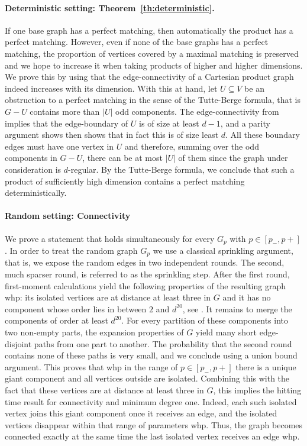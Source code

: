 \documentclass[notitlepage]{scrartcl}
\begin{document}
\paragraph{Deterministic setting: Theorem~\ref{th:deterministic}.}
If one base graph has a perfect matching, then automatically the product has a perfect matching. However, even if none of the base graphs has a perfect matching, the proportion of vertices covered by a maximal matching is preserved and we hope to increase it when taking products of higher and higher dimensions. We prove this by using that the edge-connectivity of a Cartesian product graph indeed increases with its dimension. With this at hand, let $U \subseteq V$ be an obstruction to a perfect matching in the sense of the Tutte-Berge formula, that is $G - U$ contains more than $|U|$ odd components. The edge-connectivity from  implies that the edge-boundary of $U$ is of size at least $d-1$, and a parity argument shows then shows that in fact this is of size least $d$. All these boundary edges must have one vertex in $U$ and therefore, summing over the odd components in $G-U$, there can be at most $|U|$ of them since the graph under consideration is $d$-regular. By the Tutte-Berge formula, we conclude that such a product of sufficiently high dimension contains a perfect matching deterministically.


\paragraph{Random setting: Connectivity}

We prove a statement that holds simultaneously for every $G_p$ with $p \in [p_-,p+]$. In order to treat the random graph $G_p$ we use a classical sprinkling argument, that is, we expose the random edges in two independent rounds. The second, much sparser round, is referred to as the sprinkling step. After the first round, first-moment calculations yield the following properties of the resulting graph whp: its isolated vertices are at distance at least three in $G$ and it has no component whose order lies in between $2$ and $d^{20}$, see . It remains to merge the components of order at least $d^{20}$. For every partition of these components into two non-empty parts, the expansion properties of $G$ yield many short edge-disjoint paths from one part to another. The probability that the second round contains none of these paths is very small, and we conclude using a union bound argument. This proves that whp in the range of $p \in [p_-, p+]$ there is a unique giant component and all vertices outside are isolated. Combining this with the fact that these vertices are at distance at least three in $G$, this implies the hitting time result for connectivity and minimum degree one. Indeed, each such isolated vertex joins this giant component once it receives an edge, and the isolated vertices disappear within that range of parameters whp. Thus, the graph becomes connected exactly at the same time the last isolated vertex receives an edge whp.
\end{document}
